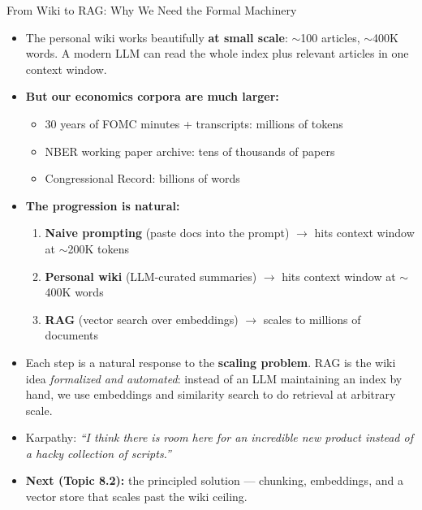 \begin{frame}{From Wiki to RAG: Why We Need the Formal Machinery}
\begin{itemize}
\item The personal wiki works beautifully \textbf{at small scale}: ${\sim}$100 articles, ${\sim}$400K words. A modern LLM can read the whole index plus relevant articles in one context window.

\medskip
\item \textbf{But our economics corpora are much larger:}
\begin{itemize}
    \item 30 years of FOMC minutes + transcripts: millions of tokens
    \item NBER working paper archive: tens of thousands of papers
    \item Congressional Record: billions of words
\end{itemize}

\medskip
\item \textbf{The progression is natural:}
\begin{enumerate}
    \item \textbf{Naive prompting} (paste docs into the prompt) $\to$ hits context window at ${\sim}$200K tokens
    \item \textbf{Personal wiki} (LLM-curated summaries) $\to$ hits context window at ${\sim}$400K words
    \item \textbf{RAG} (vector search over embeddings) $\to$ scales to millions of documents
\end{enumerate}

\medskip
\item Each step is a natural response to the \textbf{scaling problem}. RAG is the wiki idea \emph{formalized and automated}: instead of an LLM maintaining an index by hand, we use embeddings and similarity search to do retrieval at arbitrary scale.

\medskip
\item Karpathy: \emph{``I think there is room here for an incredible new product instead of a hacky collection of scripts.''}

\medskip
\item \textbf{Next (Topic 8.2):} the principled solution --- chunking, embeddings, and a vector store that scales past the wiki ceiling.
\end{itemize}
\end{frame}


